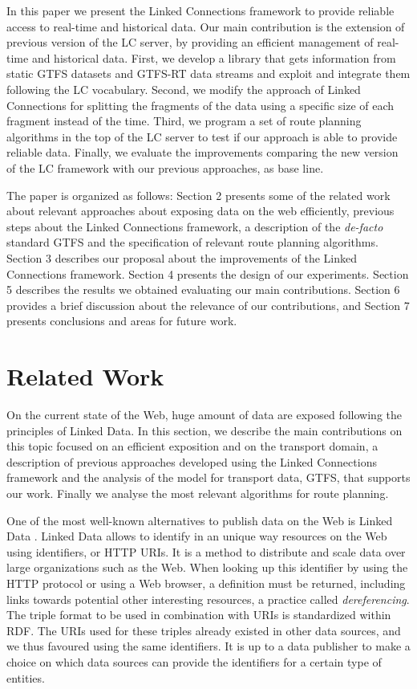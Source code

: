 \documentclass[sw]{iosart2x}
\begin{document}
In this paper we present the Linked Connections framework to provide reliable access to real-time and historical data. Our main contribution is the extension of previous version of the LC server, by providing an efficient management of real-time and historical data. First, we develop a library that gets information from static GTFS datasets and GTFS-RT data streams and exploit and integrate them following the LC vocabulary. Second, we modify the approach of Linked Connections for splitting the fragments of the data using a specific size of each fragment instead of the time. Third, we program a set of route planning algorithms in the top of the LC server to test if our approach is able to provide reliable data. Finally, we evaluate the improvements comparing the new version of the LC framework with our previous approaches, as base line.

The paper is organized as follows: Section 2 presents some of the related work about relevant approaches about exposing data on the web efficiently,  previous steps about the Linked Connections framework, a description of the \textit{de-facto} standard GTFS and the specification of relevant route planning algorithms. Section 3 describes our proposal about the improvements of the Linked Connections framework. Section 4 presents the design of our experiments. Section 5 describes the results we obtained evaluating our main contributions. Section 6 provides a brief discussion about the relevance of our contributions, and Section 7 presents conclusions and areas for future work.



\section{Related Work}\label{related_work} %
On the current state of the Web, huge amount of data are exposed following the principles of Linked Data. In this section, we describe the main contributions on this topic focused on an efficient exposition and on the transport domain, a description of previous approaches developed using the Linked Connections framework and the analysis of the model for transport data, GTFS, that supports our work. Finally we analyse the most relevant algorithms for route planning.

One of the most well-known alternatives to publish data on the Web is Linked Data \cite{bizer2009linked}. Linked Data allows to identify in an unique way resources on the Web using identifiers, or HTTP URIs. It is a method to distribute and scale data over large organizations such as the Web. When looking up this identifier by using the HTTP protocol or using a Web browser, a definition must be returned, including links towards potential other interesting resources, a practice called \textit{dereferencing}. The triple format to be used in combination with URIs is standardized within RDF. The URIs used for these triples already existed in other data sources, and we thus favoured using the same identifiers. It is up to a data publisher to make a choice on which data sources can provide the identifiers for a certain type of entities. 
\end{document}

